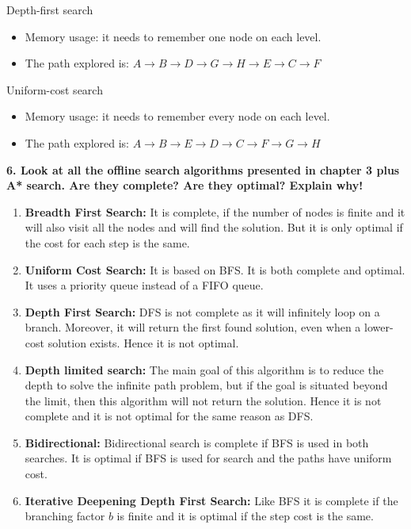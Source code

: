 \documentclass[a4paper,10pt]{article}
\begin{document}
Depth-first search
\begin{itemize}
	\item Memory usage: it needs to remember one node on each level.
	\item The path explored is: $A \rightarrow B \rightarrow D \rightarrow G \rightarrow 
	H \rightarrow E \rightarrow C \rightarrow F$
\end{itemize}

Uniform-cost search
\begin{itemize}
	\item Memory usage: it needs to remember every node on each level.
	\item The path explored is: $A \rightarrow B \rightarrow E \rightarrow D \rightarrow 
	C \rightarrow F \rightarrow G \rightarrow H$
\end{itemize}

\textbf{6. Look at all the offline search algorithms presented in chapter 3 plus A* search. 
Are they complete? Are they optimal? Explain why!}

\begin{enumerate}
	\item \textbf{Breadth First Search:} 
	It is complete, if the number of nodes is finite and it will also visit all the nodes and 
	will find the solution. But it is only optimal if the cost for each step is the same.
	\item \textbf{Uniform Cost Search:} 
	It is based on BFS. It is both complete and optimal. 
	It uses a priority queue instead of a FIFO queue.
	\item \textbf{Depth First Search:} 
	DFS is not complete as it will infinitely loop on a branch. 
	Moreover, it will return the first found solution, even when a lower-cost solution exists.
	Hence it is not optimal.
	\item \textbf{Depth limited search:} 
	The main goal of this algorithm is to reduce the depth to solve the infinite path problem, 
	but if the goal is situated beyond the limit, then this algorithm will not return the solution. 
	Hence it is not complete and it is not optimal for the same reason as DFS.
	\item \textbf{Bidirectional:} 
	Bidirectional search is complete if BFS is used in both searches. 
	It is optimal if BFS is used for search and the paths have uniform cost.
	\item \textbf{Iterative Deepening Depth First Search:} 
	Like BFS it is complete if the branching factor $b$ is finite and it is optimal if the 
	step cost is the same.
\end{enumerate}
\end{document}
